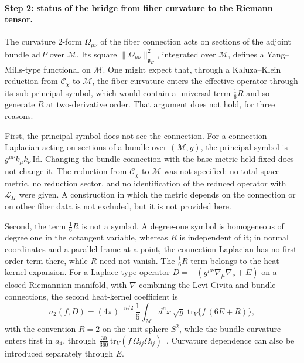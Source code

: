   \paragraph{Step 2: status of the bridge from fiber curvature to the Riemann tensor.}
    The curvature 2-form $\Omega_{\mu\nu}$ of the fiber connection acts on sections of the
    adjoint bundle $\mathrm{ad}\,P$ over $\mathcal{M}$.
    Its square $\|\Omega_{\mu\nu}\|^2_{\mathfrak{g}_\Pi}$, integrated over $\mathcal{M}$,
    defines a Yang--Mills-type functional on $\mathcal{M}$.
    One might expect that, through a Kaluza--Klein reduction from
    $\mathcal{C}_\chi$ to $\mathcal{M}$, the fiber curvature enters the effective operator through its
    sub-principal symbol, which would contain a universal term $\tfrac{1}{6}R$ and so generate $R$ at
    two-derivative order.
    That argument does not hold, for three reasons.

    First, the principal symbol does not see the connection.
    For a connection Laplacian acting on sections of a bundle over $(\mathcal{M}, g)$, the principal symbol is
    $g^{\mu\nu}k_\mu k_\nu\,\mathrm{Id}$.
    Changing the bundle connection with the base metric held fixed does not change it.
    The reduction from $\mathcal{C}_\chi$ to $\mathcal{M}$ was not specified: no total-space metric, no reduction
    sector, and no identification of the reduced operator with $\mathcal{L}_\Pi$ were given.
    A construction in which the metric depends on the connection or on other fiber data is not excluded,
    but it is not provided here.

    Second, the term $\tfrac{1}{6}R$ is not a symbol.
    A degree-one symbol is homogeneous of degree one in the cotangent variable, whereas $R$ is independent of it;
    in normal coordinates and a parallel frame at a point, the connection Laplacian has no first-order term there,
    while $R$ need not vanish.
    The $\tfrac{1}{6}R$ term belongs to the heat-kernel expansion.
    For a Laplace-type operator $D = -(g^{\mu\nu}\nabla_\mu\nabla_\nu + E)$ on a closed Riemannian manifold,
    with $\nabla$ combining the Levi-Civita and bundle connections, the second heat-kernel
    coefficient is~\cite[Eq.~(4.27)]{Vassilevich2003}
    \begin{equation}
      a_2(f, D)
      =
      (4\pi)^{-n/2}\,\frac{1}{6}
      \int_{\mathcal{M}} d^n x\,\sqrt{g}\;
      \mathrm{tr}_V\bigl\{ f\,(6E + R) \bigr\},
      \label{eq:subprincipal-symbol}
    \end{equation}
    with the convention $R = 2$ on the unit sphere $S^2$, while the bundle curvature enters first in $a_4$, through
    $\tfrac{30}{360}\,\mathrm{tr}_V(f\,\Omega_{ij}\Omega_{ij})$~\cite[Eq.~(4.28)]{Vassilevich2003}.
    Curvature dependence can also be introduced separately through $E$.

